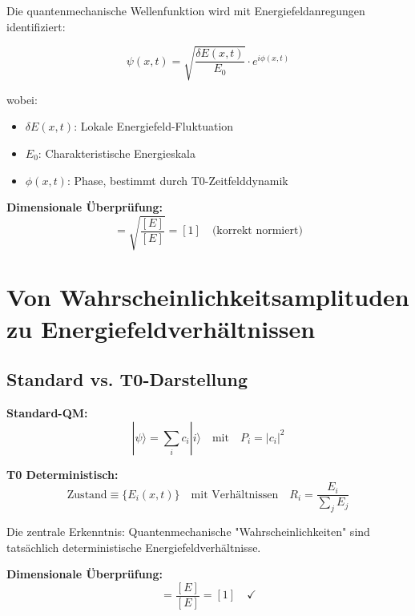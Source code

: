 \documentclass[12pt,a4paper]{report}
\begin{document}
	Die quantenmechanische Wellenfunktion wird mit Energiefeldanregungen identifiziert:
	
	\begin{equation}
		\psi(x,t) = \sqrt{\frac{\delta E(x,t)}{E_0}} \cdot e^{i\phi(x,t)}
		\label{eq:wave_function_energy}
	\end{equation}
	
	wobei:
	\begin{itemize}
		\item $\delta E(x,t)$: Lokale Energiefeld-Fluktuation
		\item $E_0$: Charakteristische Energieskala
		\item $\phi(x,t)$: Phase, bestimmt durch T0-Zeitfelddynamik
	\end{itemize}
	
	\textbf{Dimensionale Überprüfung:}
	\begin{equation}
		[\psi] = \sqrt{\frac{[E]}{[E]}} = [1] \quad \text{(korrekt normiert)}
	\end{equation}
	
	\section{Von Wahrscheinlichkeitsamplituden zu Energiefeldverhältnissen}
	\label{sec:amplitudes_to_ratios}
	
	\subsection{Standard vs. T0-Darstellung}
	\label{subsec:standard_vs_t0}
	
	\textbf{Standard-QM:}
	\begin{equation}
		|\psi\rangle = \sum_i c_i |i\rangle \quad \text{mit} \quad P_i = |c_i|^2
	\end{equation}
	
	\textbf{T0 Deterministisch:}
	\begin{equation}
		\text{Zustand} \equiv \{E_i(x,t)\} \quad \text{mit Verhältnissen} \quad R_i = \frac{E_i}{\sum_j E_j}
	\end{equation}
	
	Die zentrale Erkenntnis: Quantenmechanische "Wahrscheinlichkeiten" sind tatsächlich deterministische Energiefeldverhältnisse.
	
	\textbf{Dimensionale Überprüfung:}
	\begin{equation}
		[R_i] = \frac{[E]}{[E]} = [1] \quad \checkmark
	\end{equation}
	
\end{document}
